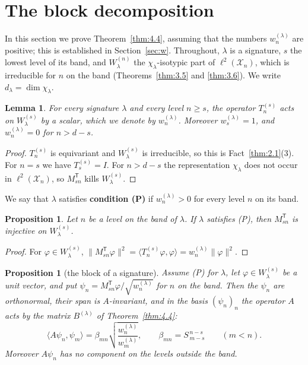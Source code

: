 \documentclass[11pt]{article}
\numberwithin{equation}{section}
\theoremstyle{plain}
\newtheorem{proposition}[theorem]{Proposition}
\newtheorem{lemma}[theorem]{Lemma}
\theoremstyle{definition}
\begin{document}
\section{The block decomposition}\label{sec:4}

In this section we prove Theorem~\ref{thm:4.4}, assuming that the numbers $w^{(\lambda)}_n$ are
positive; this is established in Section~\ref{sec:w}. Throughout, $\lambda$ is a signature, $s$
the lowest level of its band, and $W^{(n)}_\lambda$ the $\chi_\lambda$-isotypic part of
$\ell^2(\mathcal{X}_n)$, which is irreducible for $n$ on the band (Theorems~\ref{thm:3.5} and \ref{thm:3.6}). We
write $d_\lambda=\dim\chi_\lambda$.

\begin{lemma}\label{thm:4.1}
For every signature $\lambda$ and every level $n\ge s$, the operator
$T^{(s)}_n$ acts on $W^{(s)}_\lambda$ by a scalar, which we denote by
$w^{(\lambda)}_n$. Moreover $w^{(\lambda)}_{s}=1$, and $w^{(\lambda)}_n=0$ for
$n>d-s$.
\end{lemma}

\begin{proof}
$T^{(s)}_n$ is equivariant and $W^{(s)}_\lambda$ is irreducible, so this
is Fact~\ref{thm:2.1}(3). For $n=s$ we have $T^{(s)}_{s}=I$. For $n>d-s$ the
representation $\chi_\lambda$ does not occur in $\ell^2(\mathcal{X}_n)$, so
$M_{sn}^{\mathsf T}$ kills $W^{(s)}_\lambda$.
\end{proof}

We say that $\lambda$ satisfies \textbf{condition (P)} if $w^{(\lambda)}_n>0$ for every
level $n$ on its band.

\begin{proposition}\label{thm:4.2}
Let $n$ be a level on the band of $\lambda$. If $\lambda$
satisfies (P), then $M_{sn}^{\mathsf T}$ is injective on $W^{(s)}_\lambda$.
\end{proposition}

\begin{proof}
For $\varphi\in W^{(s)}_\lambda$,
$\lVert M_{sn}^{\mathsf T}\varphi\rVert^2=\langle T^{(s)}_n\varphi,\varphi\rangle=
w^{(\lambda)}_n\lVert\varphi\rVert^2$.
\end{proof}

\begin{proposition}[the block of a signature]\label{thm:4.3}
Assume (P) for $\lambda$, let
$\varphi\in W^{(s)}_\lambda$ be a unit vector, and put
$\psi_n=M_{sn}^{\mathsf T}\varphi/\sqrt{w^{(\lambda)}_n}$ for $n$ on the band. Then
the $\psi_n$ are orthonormal, their span is $A$-invariant, and in the basis
$(\psi_n)_n$ the operator $A$ acts by the matrix $B^{(\lambda)}$ of Theorem~\ref{thm:4.4}:
\[
\langle A\psi_n,\psi_m\rangle
=\beta_{mn}\sqrt{\frac{w^{(\lambda)}_n}{w^{(\lambda)}_m}},
\qquad
\beta_{mn}=S^{\,n-s}_{\,m-s}\qquad(m<n).
\]
Moreover $A\psi_n$ has no component on the levels outside the band.
\end{proposition}
\end{document}
